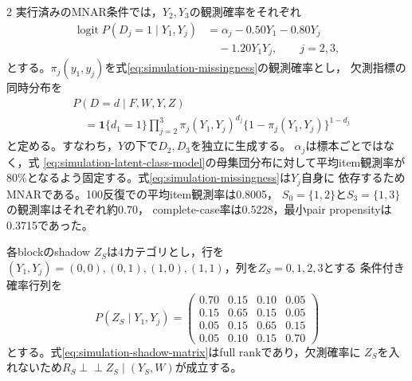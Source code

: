 \documentclass[a4paper,10pt]{article}
\newcommand{\indep}{\mathrel{\perp\!\!\!\perp}}
\begin{document}
\begin{multicols}{2}
実行済みのMNAR条件では，$Y_2,Y_3$の観測確率をそれぞれ
\begin{equation}
\begin{aligned}
\operatorname{logit}P(D_j=1\mid Y_1,Y_j)
&=\alpha_j-0.50Y_1-0.80Y_j\\
&\quad-1.20Y_1Y_j,\qquad j=2,3,
\end{aligned}
\label{eq:simulation-missingness}
\end{equation}
とする。$\pi_j(y_1,y_j)$を式\eqref{eq:simulation-missingness}の観測確率とし，
欠測指標の同時分布を
\begin{equation}
\begin{aligned}
&P(D=d\mid F,W,Y,Z)\\
&\quad=\mathbf{1}\{d_1=1\}\prod_{j=2}^3
\pi_j(Y_1,Y_j)^{d_j}\{1-\pi_j(Y_1,Y_j)\}^{1-d_j}
\end{aligned}
\label{eq:simulation-response-pattern}
\end{equation}
と定める。すなわち，$Y$の下で$D_2,D_3$を独立に生成する。
$\alpha_j$は標本ごとではなく，式
\eqref{eq:simulation-latent-class-model}の母集団分布に対して平均item観測率が
80\%となるよう固定する。式\eqref{eq:simulation-missingness}は$Y_j$自身に
依存するためMNARである。100反復での平均item観測率は0.8005，
$S_0=\{1,2\}$と$S_3=\{1,3\}$の観測率はそれぞれ約0.70，
complete-case率は0.5228，最小pair propensityは0.3715であった。

各blockのshadow $Z_S$は4カテゴリとし，行を
$(Y_1,Y_j)=(0,0),(0,1),(1,0),(1,1)$，列を$Z_S=0,1,2,3$とする
条件付き確率行列を
\begin{equation}
P(Z_S\mid Y_1,Y_j)=
\begin{pmatrix}
0.70&0.15&0.10&0.05\\
0.15&0.65&0.15&0.05\\
0.05&0.15&0.65&0.15\\
0.05&0.10&0.15&0.70
\end{pmatrix}
\label{eq:simulation-shadow-matrix}
\end{equation}
とする。式\eqref{eq:simulation-shadow-matrix}はfull rankであり，欠測確率に
$Z_S$を入れないため$R_S\indep Z_S\mid(Y_S,W)$が成立する。


\end{multicols}
\end{document}
